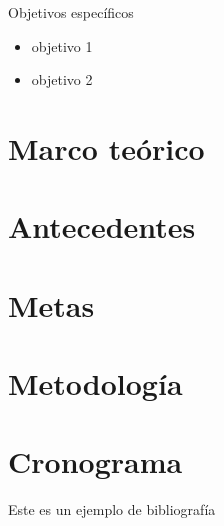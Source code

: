 \documentclass[12pt,openany]{book}
\begin{document}
\vspace{5 cm}
\Large{Objetivos específicos}
\begin{itemize}
 \item objetivo 1
 \item objetivo 2
\end{itemize}

\chapter{Marco teórico}

\chapter{Antecedentes}

\chapter{Metas}

\chapter{Metodología}

\chapter{Cronograma}

Este es un ejemplo de bibliografía \cite{OpticaPochi}

\newpage

\end{document}
